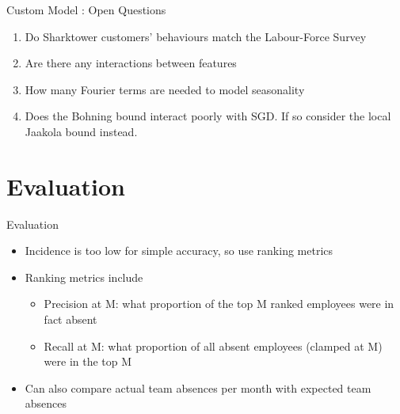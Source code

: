 \documentclass[xcolor=dvipsnames]{beamer}
\begin{document}
\begin{frame}{Custom Model : Open Questions}

\begin{enumerate}
    \item Do Sharktower customers' behaviours match the Labour-Force Survey
    \item Are there any interactions between features
    \item How many Fourier terms are needed to model seasonality
    \item Does the Bohning bound interact poorly with SGD. If so consider the local Jaakola bound\cite{Jaakkola1997} instead.
\end{enumerate}

\end{frame}



\section{Evaluation}
\begin{frame}{Evaluation}

\begin{itemize}
    \item Incidence is too low for simple accuracy, so use ranking metrics
    \item Ranking metrics include
    \begin{itemize}
        \item Precision at M: what proportion of the top M ranked employees were in fact absent
        \item Recall at M: what proportion of all absent employees (clamped at M) were in the top M
    \end{itemize}
        
    \item Can also compare actual team absences per month with expected team absences
\end{itemize}

\end{frame}

\end{document}
